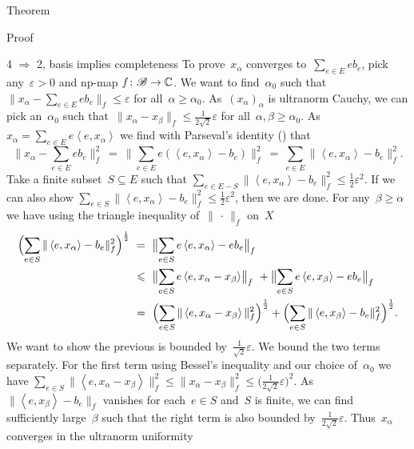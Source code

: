 \begin{parsec}
\begin{point}{Theorem}
\begin{point}{Proof}
\begin{point}{4 $\Rightarrow$ 2, basis implies completeness}
To prove~$x_\alpha$ converges to~$\sum_{e \in E} e b_e$,
    pick any~$\varepsilon > 0$
        and np-map $f\colon \scrB \to \C$.
We want to find~$\alpha_0$
    such that~$\| x_\alpha - \sum_{e \in E} e b_e\|_f \leq \varepsilon$
        for all~$\alpha \geq \alpha_0$.
As~$(x_\alpha)_\alpha$ is ultranorm Cauchy,
we can pick an~$\alpha_0$
such that~$\| x_\alpha - x_\beta \|_f \leq \frac{1}{2\sqrt{2}} \varepsilon$
for all~$\alpha,\beta \geq \alpha_0$.
As~$x_\alpha = \sum_{e \in E} e \left<e,x_\alpha\right>$
we find with Parseval's identity () that
\begin{equation*}
    \bigl\| x_\alpha - \sum_{e \in E} eb_e \bigr\|_f^2
    \ =\  \bigl\| \sum_{e \in E} e(\left<e, x_\alpha\right> - b_e) \bigr\|_f^2
    \ =\  \sum_{e \in E}\| \left<e, x_\alpha\right> - b_e \|_f^2.
\end{equation*}
Take a finite subset~$S \subseteq E$
such that
    $\sum_{e \in E - S}\| \left<e, x_\alpha\right> - b_e \|_f^2 \leq
        \frac{1}{2}\varepsilon^2$.
If we can also show
    $\sum_{e \in  S}\| \left<e, x_\alpha\right> - b_e \|_f^2 \leq
        \frac{1}{2}\varepsilon^2$,
        then we are done.
For any~$\beta \geq \alpha$
    we have using the triangle inequality of~$\|\,\cdot\,\|_f$
        on~$X$
\begin{align*}
    \Bigl(\sum_{e \in S}\| \left<e, x_\alpha\right>
        - b_e \|_f^2\Bigr)^{\frac{1}{2}}
        &\ =\  \bigl\|\sum_{e \in S} e\left<e, x_\alpha\right> - eb_e \bigr\|_f\\
        &\ \leq\  \bigl\|\sum_{e \in S} e\left<e, x_\alpha-x_\beta\right> \bigr\|_f\
        +\bigl\|\sum_{e \in S} e\left<e, x_\beta\right> - eb_e \bigr\|_f\\
        &\ =\  \Bigl( \sum_{e \in S}\|\left<e, x_\alpha-x_\beta\right> \|_f^2 \Bigr)^{\frac{1}{2}}
        +\Bigl(\sum_{e \in S}\| \left<e, x_\beta\right> - b_e \|_f^2
        \Bigr)^{\frac{1}{2}}.
\end{align*}
We want to show the previous is bounded by~$\frac{1}{\sqrt{2}}\varepsilon$.
We bound the two terms separately.
For the first term using Bessel's
inequality and our choice of~$\alpha_0$
we have
$\sum_{e \in S}\|\left<e, x_\alpha-x_\beta\right> \|_f^2 
\leq \|x_\alpha - x_\beta\|^2_f \leq \bigl(\frac{1}{2\sqrt{2}}\varepsilon\bigr)^2.$
As~$\|\left<e,x_\beta\right> - b_e\|_f$
vanishes for each~$e \in S$ and~$S$ is finite,
we can find sufficiently large~$\beta$
such that the right term is also bounded by~$\frac{1}{2\sqrt{2}}\varepsilon$.
Thus~$x_\alpha$ converges in the ultranorm uniformity

\end{point}
\end{point}
\end{point}
\end{parsec}
